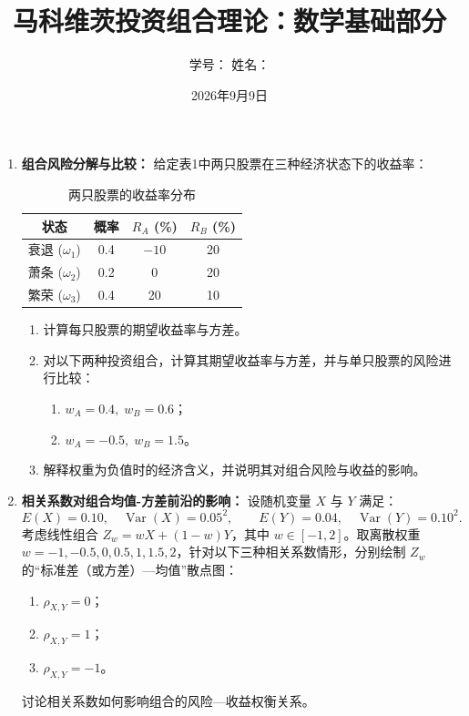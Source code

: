 \documentclass{article}
\author{学号：\underline{\hspace{4cm}} 姓名：\underline{\hspace{4cm}} }
\title{马科维茨投资组合理论：数学基础部分}
\date{2026年9月9日}
\begin{document}
\maketitle

\begin{enumerate}\itemsep0cm 

\item \textbf{组合风险分解与比较：}
给定表1中两只股票在三种经济状态下的收益率：

\begin{table}[h!]
\centering
\begin{tabular}{cccc}
\toprule
状态 & 概率 & $R_A$ (\%) & $R_B$ (\%) \\
\midrule
衰退 ($\omega_1$) & 0.4 & $-10$ & 20 \\
萧条 ($\omega_2$) & 0.2 & 0 & 20 \\
繁荣 ($\omega_3$) & 0.4 & 20 & 10 \\
\bottomrule
\end{tabular}
\caption{两只股票的收益率分布}
\end{table}

\begin{enumerate}
\item 计算每只股票的期望收益率与方差。
\item 对以下两种投资组合，计算其期望收益率与方差，并与单只股票的风险进行比较：
  \begin{enumerate}
    \item $w_A = 0.4,\; w_B = 0.6$；
    \item $w_A = -0.5,\; w_B = 1.5$。
  \end{enumerate}
\item 解释权重为负值时的经济含义，并说明其对组合风险与收益的影响。
\end{enumerate}

\item \textbf{相关系数对组合均值-方差前沿的影响：}
设随机变量 $X$ 与 $Y$ 满足：
\[
E(X)=0.10,\quad \operatorname{Var}(X)=0.05^2,\qquad
E(Y)=0.04,\quad \operatorname{Var}(Y)=0.10^2.
\]
考虑线性组合 $Z_w = wX + (1-w)Y$，其中 $w \in [-1,2]$。取离散权重 $w = -1, -0.5, 0, 0.5, 1, 1.5, 2$，针对以下三种相关系数情形，分别绘制 $Z_w$ 的“标准差（或方差）—均值”散点图：
\begin{enumerate}
\item $\rho_{X,Y} = 0$；
\item $\rho_{X,Y} = 1$；
\item $\rho_{X,Y} = -1$。
\end{enumerate}
讨论相关系数如何影响组合的风险—收益权衡关系。


\end{enumerate}
\end{document}
